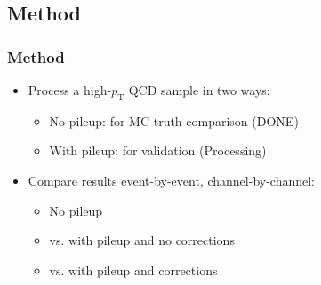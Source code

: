 \documentclass[bigger]{beamer}
\begin{document}
\subsection{Method}
\label{sec-2-1}
\begin{frame}
\frametitle{Method}
\label{sec-2-1-1}
\begin{itemize}

\item Process a high-$p_{\text{T}}$ QCD sample in two ways:
\label{sec-2-1-1-1}%
\begin{itemize}

\item No pileup: for MC truth comparison (DONE)
\label{sec-2-1-1-1-1}%

\item With pileup: for validation (Processing)
\label{sec-2-1-1-1-2}%
\end{itemize} %

\item Compare results event-by-event, channel-by-channel:
\label{sec-2-1-1-2}%
\begin{itemize}

\item No pileup
\label{sec-2-1-1-2-1}%

\item vs. with pileup and no corrections
\label{sec-2-1-1-2-2}%

\item vs. with pileup and corrections
\label{sec-2-1-1-2-3}%
\end{itemize} %
\end{itemize} %
\end{frame}
\end{document}
